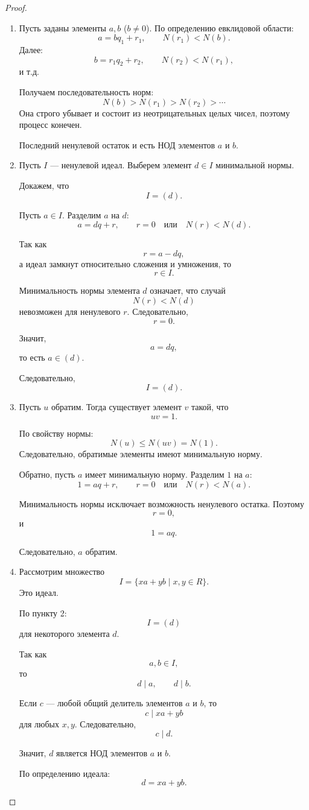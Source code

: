 \documentclass[12pt, a4paper]{article}
\theoremstyle{definition}
\theoremstyle{remark}
\begin{document}
\begin{proof}
	\begin{enumerate}
		\item Пусть заданы элементы $a,b$ ($b\ne0$).
		По определению евклидовой области:
		\[
		a=bq_1+r_1,
		\qquad N(r_1)<N(b).
		\]
		Далее:
		\[
		b=r_1q_2+r_2,
		\qquad N(r_2)<N(r_1),
		\]
		и т.д.
		
		Получаем последовательность норм:
		\[
		N(b)>N(r_1)>N(r_2)>\cdots
		\]
		Она строго убывает и состоит из неотрицательных целых чисел,
		поэтому процесс конечен.
		
		Последний ненулевой остаток и есть НОД элементов $a$ и $b$.
		
		\item Пусть $I$ --- ненулевой идеал.
		Выберем элемент $d\in I$ минимальной нормы.
		
		Докажем, что
		\[
		I=(d).
		\]
		
		Пусть $a\in I$.
		Разделим $a$ на $d$:
		\[
		a=dq+r,
		\qquad r=0
		\quad \text{или} \quad
		N(r)<N(d).
		\]
		
		Так как
		\[
		r=a-dq,
		\]
		а идеал замкнут относительно сложения и умножения,
		то
		\[
		r\in I.
		\]
		
		Минимальность нормы элемента $d$ означает, что случай
		\[
		N(r)<N(d)
		\]
		невозможен для ненулевого $r$.
		Следовательно,
		\[
		r=0.
		\]
		
		Значит,
		\[
		a=dq,
		\]
		то есть $a\in(d)$.
		
		Следовательно,
		\[
		I=(d).
		\]
		
		\item Пусть $u$ обратим.
		Тогда существует элемент $v$ такой, что
		\[
		uv=1.
		\]
		
		По свойству нормы:
		\[
		N(u)\le N(uv)=N(1).
		\]
		Следовательно, обратимые элементы имеют минимальную норму.
		
		Обратно, пусть $a$ имеет минимальную норму.
		Разделим $1$ на $a$:
		\[
		1=aq+r,
		\qquad r=0
		\quad \text{или} \quad
		N(r)<N(a).
		\]
		
		Минимальность нормы исключает возможность ненулевого остатка.
		Поэтому
		\[
		r=0,
		\]
		и
		\[
		1=aq.
		\]
		
		Следовательно, $a$ обратим.
		
		\item Рассмотрим множество
		\[
		I=\{xa+yb \mid x,y\in R\}.
		\]
		Это идеал.
		
		По пункту 2:
		\[
		I=(d)
		\]
		для некоторого элемента $d$.
		
		Так как
		\[
		a,b\in I,
		\]
		то
		\[
		d\mid a,
		\qquad d\mid b.
		\]
		
		Если $c$ --- любой общий делитель элементов $a$ и $b$, то
		\[
		c\mid xa+yb
		\]
		для любых $x,y$.
		Следовательно,
		\[
		c\mid d.
		\]
		
		Значит, $d$ является НОД элементов $a$ и $b$.
		
		По определению идеала:
		\[
		d=xa+yb.
		\]
	\end{enumerate}
\end{proof}
\end{document}
